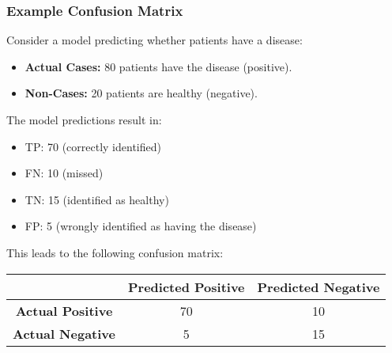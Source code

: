 \documentclass[aspectratio=169]{beamer}
\begin{document}
\begin{frame}[fragile]
  \frametitle{Example Confusion Matrix}
  Consider a model predicting whether patients have a disease:
  
  \begin{itemize}
    \item \textbf{Actual Cases:} 80 patients have the disease (positive).
    \item \textbf{Non-Cases:} 20 patients are healthy (negative).
  \end{itemize}

  The model predictions result in:
  
  \begin{itemize}
    \item TP: 70 (correctly identified)
    \item FN: 10 (missed)
    \item TN: 15 (identified as healthy)
    \item FP: 5 (wrongly identified as having the disease)
  \end{itemize}

  This leads to the following confusion matrix:

  \begin{center}
    \begin{tabular}{|c|c|c| }
      \hline
             & \textbf{Predicted Positive} & \textbf{Predicted Negative} \\
      \hline
      \textbf{Actual Positive} & 70 & 10 \\
      \hline
      \textbf{Actual Negative} & 5 & 15 \\
      \hline
    \end{tabular}
  \end{center}
\end{frame}
\end{document}
